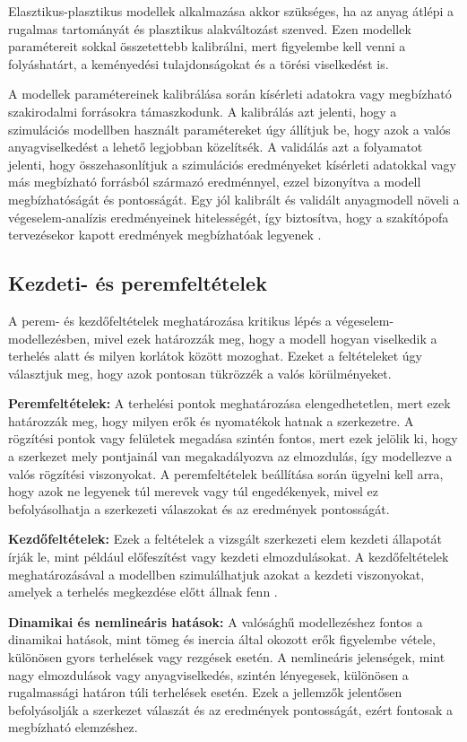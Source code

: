 \documentclass[12pt,a4paper,oneside]{report}
\begin{document}
Elasztikus-plasztikus modellek alkalmazása akkor szükséges, ha az anyag átlépi a rugalmas tartományát és plasztikus alakváltozást szenved. Ezen modellek paramétereit sokkal összetettebb kalibrálni, mert figyelembe kell venni a folyáshatárt, a keményedési tulajdonságokat és a törési viselkedést is.

A modellek paramétereinek kalibrálása során kísérleti adatokra vagy megbízható szakirodalmi forrásokra támaszkodunk. A kalibrálás azt jelenti, hogy a szimulációs modellben használt paramétereket úgy állítjuk be, hogy azok a valós anyagviselkedést a lehető legjobban közelítsék. A validálás azt a folyamatot jelenti, hogy összehasonlítjuk a szimulációs eredményeket kísérleti adatokkal vagy más megbízható forrásból származó eredménnyel, ezzel bizonyítva a modell megbízhatóságát és pontosságát. Egy jól kalibrált és validált anyagmodell növeli a végeselem-analízis eredményeinek hitelességét, így biztosítva, hogy a szakítópofa tervezésekor kapott eredmények megbízhatóak legyenek \cite{tamas2014vegeselem}.

\subsection{Kezdeti- és peremfeltételek}
A perem- és kezdőfeltételek meghatározása kritikus lépés a végeselem-modellezésben, mivel ezek határozzák meg, hogy a modell hogyan viselkedik a terhelés alatt és milyen korlátok között mozoghat. Ezeket a feltételeket úgy választjuk meg, hogy azok pontosan tükrözzék a valós körülményeket.

\noindent\textbf{Peremfeltételek: }
A terhelési pontok meghatározása elengedhetetlen, mert ezek határozzák meg, hogy milyen erők és nyomatékok hatnak a szerkezetre. A rögzítési pontok vagy felületek megadása szintén fontos, mert ezek jelölik ki, hogy a szerkezet mely pontjainál van megakadályozva az elmozdulás, így modellezve a valós rögzítési viszonyokat. A peremfeltételek beállítása során ügyelni kell arra, hogy azok ne legyenek túl merevek vagy túl engedékenyek, mivel ez befolyásolhatja a szerkezeti válaszokat és az eredmények pontosságát.

\noindent\textbf{Kezdőfeltételek: }
Ezek a feltételek a vizsgált szerkezeti elem kezdeti állapotát írják le, mint például előfeszítést vagy kezdeti elmozdulásokat. A kezdőfeltételek meghatározásával a modellben szimulálhatjuk azokat a kezdeti viszonyokat, amelyek a terhelés megkezdése előtt állnak fenn \cite{mankovits2015modellezes}.

\noindent\textbf{Dinamikai és nemlineáris hatások: }
A valósághű modellezéshez fontos a dinamikai hatások, mint tömeg és inercia által okozott erők figyelembe vétele, különösen gyors terhelések vagy rezgések esetén. A nemlineáris jelenségek, mint nagy elmozdulások vagy anyagviselkedés, szintén lényegesek, különösen a rugalmassági határon túli terhelések esetén. Ezek a jellemzők jelentősen befolyásolják a szerkezet válaszát és az eredmények pontosságát, ezért fontosak a megbízható elemzéshez.
\end{document}
